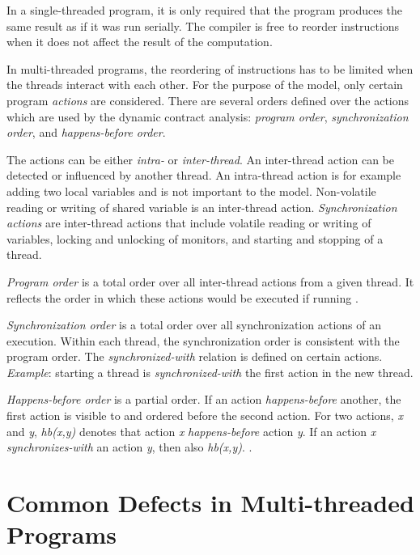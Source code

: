In a single-threaded program, it is only required that the program produces the
same result as if it was run serially. The compiler is free to reorder
instructions when it does not affect the result of the computation.

In multi-threaded programs, the reordering of instructions has to be limited
when the threads interact with each other. For the purpose of the model, only
certain program \emph{actions} are considered. There are several orders defined
over the actions which are used by the dynamic contract analysis: \emph{program
order}, \emph{synchronization order}, and \emph{happens-before order}.

The actions can be either \emph{intra-} or \emph{inter-thread}. An inter-thread
action can be detected or influenced by another thread. An intra-thread action
is for example adding two local variables and is not important to the model.
Non-volatile reading or writing of shared variable is an inter-thread action.
\emph{Synchronization actions} are inter-thread actions that include volatile
reading or writing of variables, locking and unlocking of monitors, and starting
and stopping of a thread.

\emph{Program order} is a total order over all inter-thread actions from a given
thread. It reflects the order in which these actions would be executed if
running \todo{} .

\emph{Synchronization order} is a total order over all synchronization actions
of an execution. Within each thread, the synchronization order is consistent
with the program order. The \emph{synchronized-with} relation is defined on
certain actions. \emph{Example}: starting a thread is \emph{synchronized-with}
the first action in the new thread.

\emph{Happens-before order} is a partial order. If an action
\emph{happens-before} another, the first action is visible to and ordered before
the second action. For two actions, \emph{x} and \emph{y}, \emph{hb(x,y)}
denotes that action \emph{x} \emph{happens-before} action \emph{y}. If an action
\emph{x} \emph{synchronizes-with} an action \emph{y}, then also \emph{hb(x,y)}.
\todo{}.

\section{Common Defects in Multi-threaded Programs}


